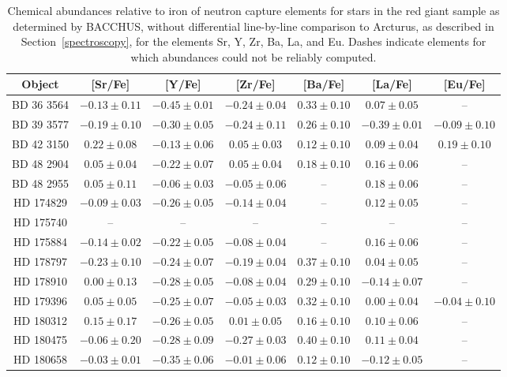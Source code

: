 \begin{table*}
\caption{Chemical abundances relative to iron of neutron capture elements for stars in the red giant sample as determined by BACCHUS, without differential line-by-line comparison to Arcturus, as described in Section~\ref{spectroscopy}, for the elements Sr, Y, Zr, Ba, La, and Eu. Dashes indicate elements for which abundances could not be reliably computed.\label{elems2}}
\begin{tabular}{ccccccc}
\hline \hline
Object & [Sr/Fe] & [Y/Fe] & [Zr/Fe] & [Ba/Fe] & [La/Fe] & [Eu/Fe] \\
\hline
BD 36 3564 & $-0.13 \pm 0.11$ & $-0.45 \pm 0.01$ & $-0.24 \pm 0.04$ & $0.33 \pm 0.10$ & $0.07 \pm 0.05$ & -- \\
BD 39 3577 & $-0.19 \pm 0.10$ & $-0.30 \pm 0.05$ & $-0.24 \pm 0.11$ & $0.26 \pm 0.10$ & $-0.39 \pm 0.01$ & $-0.09 \pm 0.10$ \\
BD 42 3150 & $0.22 \pm 0.08$ & $-0.13 \pm 0.06$ & $0.05 \pm 0.03$ & $0.12 \pm 0.10$ & $0.09 \pm 0.04$ & $0.19 \pm 0.10$ \\
BD 48 2904 & $0.05 \pm 0.04$ & $-0.22 \pm 0.07$ & $0.05 \pm 0.04$ & $0.18 \pm 0.10$ & $0.16 \pm 0.06$ & -- \\
BD 48 2955 & $0.05 \pm 0.11$ & $-0.06 \pm 0.03$ & $-0.05 \pm 0.06$ & -- & $0.18 \pm 0.06$ & -- \\
HD 174829 & $-0.09 \pm 0.03$ & $-0.26 \pm 0.05$ & $-0.14 \pm 0.04$ & -- & $0.12 \pm 0.05$ & -- \\
HD 175740 & -- & -- & -- & -- & -- & -- \\
HD 175884 & $-0.14 \pm 0.02$ & $-0.22 \pm 0.05$ & $-0.08 \pm 0.04$ & -- & $0.16 \pm 0.06$ & -- \\
HD 178797 & $-0.23 \pm 0.10$ & $-0.24 \pm 0.07$ & $-0.19 \pm 0.04$ & $0.37 \pm 0.10$ & $0.04 \pm 0.05$ & -- \\
HD 178910 & $0.00 \pm 0.13$ & $-0.28 \pm 0.05$ & $-0.08 \pm 0.04$ & $0.29 \pm 0.10$ & $-0.14 \pm 0.07$ & -- \\
HD 179396 & $0.05 \pm 0.05$ & $-0.25 \pm 0.07$ & $-0.05 \pm 0.03$ & $0.32 \pm 0.10$ & $0.00 \pm 0.04$ & $-0.04 \pm 0.10$ \\
HD 180312 & $0.15 \pm 0.17$ & $-0.26 \pm 0.05$ & $0.01 \pm 0.05$ & $0.16 \pm 0.10$ & $0.10 \pm 0.06$ & -- \\
HD 180475 & $-0.06 \pm 0.20$ & $-0.28 \pm 0.09$ & $-0.27 \pm 0.03$ & $0.40 \pm 0.10$ & $0.11 \pm 0.04$ & -- \\
HD 180658 & $-0.03 \pm 0.01$ & $-0.35 \pm 0.06$ & $-0.01 \pm 0.06$ & $0.12 \pm 0.10$ & $-0.12 \pm 0.05$ & -- \\

\end{tabular}
\end{table*}
